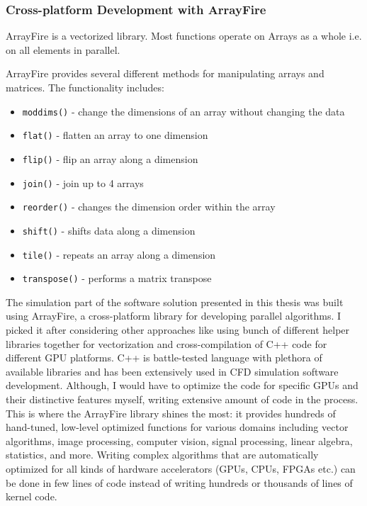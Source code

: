 \subsubsection{Cross-platform Development with ArrayFire}


ArrayFire is a vectorized library. Most functions operate on Arrays as a whole i.e. on all elements in parallel.

ArrayFire provides several different methods for manipulating arrays and matrices. The functionality includes:

\begin{itemize}
\item \texttt{moddims()} - change the dimensions of an array without changing the data
\item \texttt{flat()}  - flatten an array to one dimension
\item \texttt{flip()}  - flip an array along a dimension
\item \texttt{join()}  - join up to 4 arrays
\item \texttt{reorder()}  - changes the dimension order within the array
\item \texttt{shift()}  - shifts data along a dimension
\item \texttt{tile()}  - repeats an array along a dimension
\item \texttt{transpose()}  - performs a matrix transpose
\end{itemize}

The simulation part of the software solution presented in this thesis was built using ArrayFire, a cross-platform library for developing parallel algorithms. I picked it after considering other approaches like using bunch of different helper libraries together for vectorization and cross-compilation of C++ code for different GPU platforms. C++ is battle-tested language with plethora of available libraries and has been extensively used in CFD simulation software development. Although, I would have to optimize the code for specific GPUs and their distinctive features myself, writing extensive amount of code in the process. This is where the ArrayFire library shines the most: it provides hundreds of hand-tuned, low-level optimized functions for various domains including vector algorithms, image processing, computer vision, signal processing, linear algebra, statistics, and more. Writing complex algorithms that are automatically optimized for all kinds of hardware accelerators (GPUs, CPUs, FPGAs etc.) can be done in few lines of code instead of writing hundreds or thousands of lines of kernel code.

